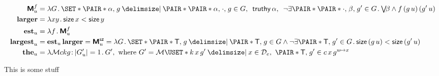 \documentclass[10pt,fleqn]{article}
\newcommand{\M}{\text{\sffamily\bfseries M}}
\begin{document}
\begin{minipage}[t]{0.6\textwidth}
\begin{spreadlines}{0em}
\begin{align*}
  \M_u^f &=
  \lambda G \dt
    \set{%
      \pair{\cn{\alpha}}{g}
    \giv
      \pair{\pair{\cn{\alpha}}{\cdot}}{g} \in G
      ,\ \, 
      \cn{truthy}\,\alpha
      ,\ \, 
      \neg\exists\pair{\pair{\cdot}{\beta}}{g'} \in G \dt
        \mathsmaller{\bigvee}\!\beta \land f\,(g\,u)\,(g'\,u)
    } \\
  \textbf{larger} &=
  \lambda xy \dt \cn{size}\,x < \cn{size}\,y \\
  \textbf{est}_u &=
  \lambda f \dt \M_u^f\\
  \textbf{largest}_u &=
  \textbf{est}_u\,\textbf{larger} =
  \M_u^\cn{sz} =
  \lambda G \dt
    \set{%
      \pair{\cn{T}}{g}
    \giv
      \pair{\cn{T}}{g} \in G
      \land
      \neg\exists\pair{\cn{T}}{g'} \in G \dt
        \cn{size}\,(g\,u) < \cn{size}\,(g'\,u)
    } \\
  \textbf{the}_u &=
  \lambda\mathcal{M}ckg \col |G'_u| = 1 \dt G',
  \ \textrm{where} \ 
  G' = \mathcal{M}\uset{%
    k\,x\,g'
  \giv
    x\in \mathcal{D}_e,\ \pair{\cn{T}}{g'} \in c\,x\,g^{u\mapsto x}
  }
\end{align*}
\end{spreadlines}
\end{minipage}
%
%
\begin{minipage}[t]{0.4\textwidth}
This is some stuff

\end{minipage}

\dotfill
\end{document}

